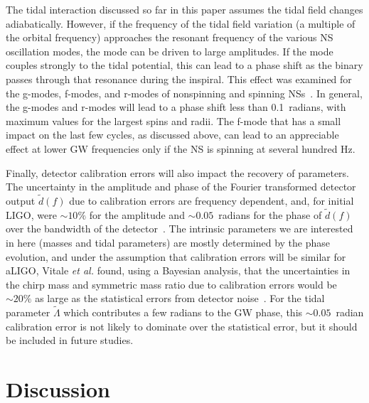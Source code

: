 \documentclass[twocolumn,prd,amssymb,aps,nofootinbib,showpacs,epsf]{revtex4}
\begin{document}
The tidal interaction discussed so far in this paper assumes the tidal field changes adiabatically. However, if the frequency of the tidal field variation (a multiple of the orbital frequency) approaches the resonant frequency of the various NS oscillation modes, the mode can be driven to large amplitudes. If the mode couples strongly to the tidal potential, this can lead to a phase shift as the binary passes through that resonance during the inspiral. This effect was examined for the g-modes, f-modes, and r-modes of nonspinning and spinning NSs~\cite{Lai1994, HoLai1999}. In general, the g-modes and r-modes will lead to a phase shift less than 0.1~radians, with maximum values for the largest spins and radii. The f-mode that has a small impact on the last few cycles, as discussed above, can lead to an appreciable effect at lower GW frequencies only if the NS is spinning at several hundred Hz. 


Finally, detector calibration errors will also impact the recovery of parameters. The uncertainty in the amplitude and phase of the Fourier transformed detector output $\tilde d(f)$ due to calibration errors are frequency dependent, and, for initial LIGO, were $\sim 10\%$ for the amplitude and $\sim 0.05$~radians for the phase of $\tilde d(f)$ over the bandwidth of the detector~\cite{VitaleDelPozzoLi2012}. The intrinsic parameters we are interested in here (masses and tidal parameters) are mostly determined by the phase evolution, and under the assumption that calibration errors will be similar for aLIGO, Vitale {\it et al.} found, using a Bayesian analysis, that the uncertainties in the chirp mass and symmetric mass ratio due to calibration errors would be $\sim 20\%$ as large as the statistical errors from detector noise~\cite{VitaleDelPozzoLi2012}. For the tidal parameter $\tilde\Lambda$ which contributes a few radians to the GW phase, this $\sim 0.05$~radian calibration error is not likely to dominate over the statistical error, but it should be included in future studies.

\section{Discussion}
\label{sec:discussion}
\end{document}
